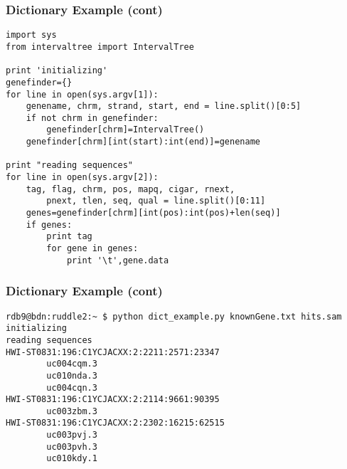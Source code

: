 \documentclass[10pt]{beamer}
\newcommand\smallfont{\fontsize{8pt}{7.2}\selectfont}
\begin{document}
\begin{frame}[fragile]
\frametitle{Dictionary Example (cont)}

\smallfont
\begin{verbatim}
import sys
from intervaltree import IntervalTree

print 'initializing'
genefinder={}
for line in open(sys.argv[1]):
    genename, chrm, strand, start, end = line.split()[0:5]
    if not chrm in genefinder:
        genefinder[chrm]=IntervalTree()
    genefinder[chrm][int(start):int(end)]=genename

print "reading sequences"
for line in open(sys.argv[2]):
    tag, flag, chrm, pos, mapq, cigar, rnext, 
        pnext, tlen, seq, qual = line.split()[0:11]
    genes=genefinder[chrm][int(pos):int(pos)+len(seq)]
    if genes:
        print tag
        for gene in genes:
            print '\t',gene.data

\end{verbatim}
\end{frame}

\begin{frame}[fragile]
\frametitle{Dictionary Example (cont)}


\smallfont
\begin{verbatim}
rdb9@bdn:ruddle2:~ $ python dict_example.py knownGene.txt hits.sam
initializing
reading sequences
HWI-ST0831:196:C1YCJACXX:2:2211:2571:23347
        uc004cqm.3
        uc010nda.3
        uc004cqn.3
HWI-ST0831:196:C1YCJACXX:2:2114:9661:90395
        uc003zbm.3
HWI-ST0831:196:C1YCJACXX:2:2302:16215:62515
        uc003pvj.3
        uc003pvh.3
        uc010kdy.1
\end{verbatim}
\end{frame}
\end{document}
